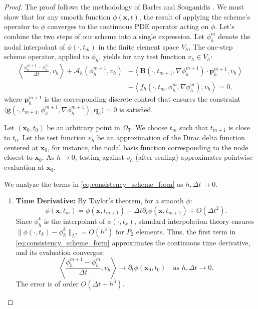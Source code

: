 \documentclass[pdflatex,sn-mathphys-num]{sn-jnl}%
\theoremstyle{thmstyleone}%
\numberwithin{equation}{section}
\begin{document}
\begin{proof}
The proof follows the methodology of Barles and Souganidis \cite{barles1991convergence}. We must show that for any smooth function $\phi(\bm{x}, t)$, the result of applying the scheme's operator to $\phi$ converges to the continuous PDE operator acting on $\phi$. Let's combine the two steps of our scheme into a single expression. Let $\phi_h^m$ denote the nodal interpolant of $\phi(\cdot, t_m)$ in the finite element space $V_h$. The one-step scheme operator, applied to $\phi_h$, yields for any test function $v_h \in V_h$:
\begin{equation}
\label{eq:consistency_scheme_form}
\begin{split}
    \left\langle \frac{\phi_h^{m+1} - \phi_h^m}{\Delta t}, v_h \right\rangle + \mathcal{A}_h(\phi_h^{m+1}, v_h) &- \left\langle \bm{B}(\cdot, t_{m+1}, \nabla \phi_h^{m+1}) \cdot \bm{p}_h^{m+1}, v_h \right\rangle \\
    &- \left\langle f_h(\cdot, t_m, \phi_h^m, \nabla \phi_h^m), v_h \right\rangle = 0,
\end{split}
\end{equation}
where $\bm{p}_h^{m+1}$ is the corresponding discrete control that ensures the constraint $\langle \bm{g}(\cdot, t_{m+1}, \phi_h^{m+1}, \nabla \phi_h^{m+1}), \bm{q}_h \rangle = 0$ is satisfied.

Let $(\bm{x}_0, t_0)$ be an arbitrary point in $\Omega_T$. We choose $t_m$ such that $t_{m+1}$ is close to $t_0$. Let the test function $v_h$ be an approximation of the Dirac delta function centered at $\bm{x}_0$, for instance, the nodal basis function corresponding to the node closest to $\bm{x}_0$. As $h \to 0$, testing against $v_h$ (after scaling) approximates pointwise evaluation at $\bm{x}_0$.

We analyze the terms in \eqref{eq:consistency_scheme_form} as $h, \Delta t \to 0$.
\begin{enumerate}
    \item[\textbf{1.}] \textbf{Time Derivative:} By Taylor's theorem, for a smooth $\phi$:
    $$\phi(\bm{x}, t_m) = \phi(\bm{x}, t_{m+1}) - \Delta t \partial_t \phi(\bm{x}, t_{m+1}) + O(\Delta t^2).$$
    Since $\phi_h^k$ is the interpolant of $\phi(\cdot, t_k)$, standard interpolation theory ensures $\|\phi(\cdot,t_k) - \phi_h^k\|_{L^2} = O(h^{3})$ for $P_2$ elements. Thus, the first term in \eqref{eq:consistency_scheme_form} approximates the continuous time derivative, and its evaluation converges:
    $$\left\langle \frac{\phi_h^{m+1} - \phi_h^m}{\Delta t}, v_h \right\rangle \to \partial_t \phi(\bm{x}_0, t_0) \quad \text{as } h, \Delta t \to 0.$$
    The error is of order $O(\Delta t + h^3)$.


\end{enumerate}
\end{proof}
\end{document}
